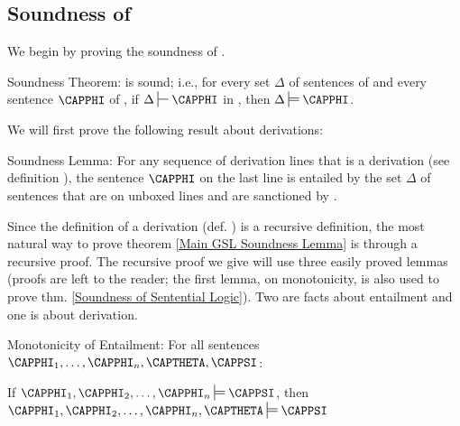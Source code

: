 \subsection{Soundness of \GSD{}}
We begin by proving the soundness of \GSD{}.
\begin{THEOREM}{ \GSD{} Soundness Theorem:}
\GSD{} is sound; i.e., for every set $\Delta$ of sentences of \GSL{} and every sentence $\CAPPHI$ of \GSL{}, if $\Delta\sststile{}{}\CAPPHI$ in \GSD{}, then $\Delta\sdtstile{}{}\CAPPHI$.
\end{THEOREM}
\noindent{}We will first prove the following result about derivations:
\begin{THEOREM}{ Soundness Lemma:}
For any sequence of derivation lines that is a derivation (see definition ), the sentence $\CAPPHI$ on the last line is entailed by the set $\Delta$ of sentences that are on unboxed lines and are sanctioned by . 
\end{THEOREM}
\noindent{}Since the definition of a derivation (def. ) is a recursive definition, the most natural way to prove theorem \ref{Main GSL Soundness Lemma} is through a recursive proof. 
The recursive proof we give will use three easily proved lemmas (proofs are left to the reader; the first lemma, on monotonicity, is also used to prove thm. \ref{Soundness of Sentential Logic}). 
Two are facts about entailment and one is about derivation.
\begin{THEOREM}{ Monotonicity of Entailment:}
For all \GSL{} sentences $\CAPPHI_1,\ldots,\CAPPHI_{\integer{n}},\CAPTHETA,\CAPPSI$:
\begin{center}
If $\CAPPHI_1,\CAPPHI_2,\ldots,\CAPPHI_{\integer{n}}\sdtstile{}{}\CAPPSI$, then $\CAPPHI_1,\CAPPHI_2,\ldots,\CAPPHI_{\integer{n}},\CAPTHETA\sdtstile{}{}\CAPPSI$
\end{center}
\end{THEOREM}
